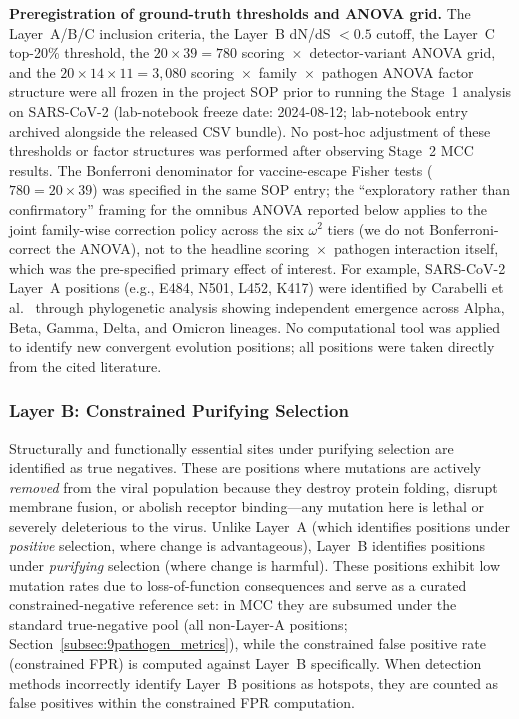 \textbf{Preregistration of ground-truth thresholds and ANOVA grid.}\label{subsubsec:preregistration} The Layer~A/B/C inclusion criteria, the Layer~B dN/dS $< 0.5$ cutoff, the Layer~C top-20\% threshold, the $20 \times 39 = 780$ scoring~$\times$~detector-variant ANOVA grid, and the $20 \times 14 \times 11 = 3{,}080$ scoring~$\times$~family~$\times$~pathogen ANOVA factor structure were all frozen in the project SOP prior to running the Stage~1 analysis on SARS-CoV-2 (lab-notebook freeze date: 2024-08-12; lab-notebook entry archived alongside the released CSV bundle). No post-hoc adjustment of these thresholds or factor structures was performed after observing Stage~2 MCC results. The Bonferroni denominator for vaccine-escape Fisher tests ($780 = 20 \times 39$) was specified in the same SOP entry; the ``exploratory rather than confirmatory'' framing for the omnibus ANOVA reported below applies to the joint family-wise correction policy across the six $\omega^2$ tiers (we do not Bonferroni-correct the ANOVA), not to the headline scoring~$\times$~pathogen interaction itself, which was the pre-specified primary effect of interest.
For example, SARS-CoV-2 Layer~A positions (e.g., E484, N501, L452, K417) were identified by Carabelli et al.~\cite{carabelli2023convergent} through phylogenetic analysis showing independent emergence across Alpha, Beta, Gamma, Delta, and Omicron lineages.
No computational tool was applied to identify new convergent evolution positions; all positions were taken directly from the cited literature.

\subsubsection{Layer B: Constrained Purifying Selection}

Structurally and functionally essential sites under purifying selection are identified as true negatives.
These are positions where mutations are actively \textit{removed} from the viral population because they destroy protein folding, disrupt membrane fusion, or abolish receptor binding---any mutation here is lethal or severely deleterious to the virus.
Unlike Layer~A (which identifies positions under \textit{positive} selection, where change is advantageous), Layer~B identifies positions under \textit{purifying} selection (where change is harmful).
These positions exhibit low mutation rates due to loss-of-function consequences and serve as a curated constrained-negative reference set: in MCC they are subsumed under the standard true-negative pool (all non-Layer-A positions; Section~\ref{subsec:9pathogen_metrics}), while the constrained false positive rate (constrained FPR) is computed against Layer~B specifically.
When detection methods incorrectly identify Layer~B positions as hotspots, they are counted as false positives within the constrained FPR computation.

